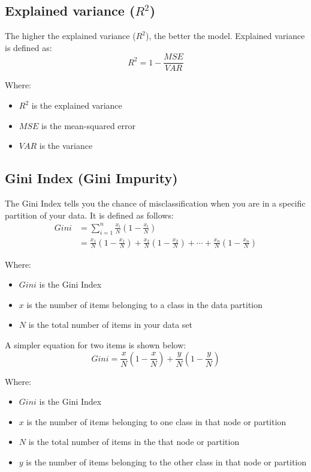 \documentclass[11pt]{article}
\begin{document}
\subsection{Explained variance (\(R^2\))}
\label{sec:org09e3cb3}
The higher the explained variance (\(R^2\)), the better the model. Explained variance is defined as:
\[R^2 = 1 - \frac{MSE}{VAR}\]

Where:
\begin{itemize}
\item \(R^2\) is the explained variance
\item \(MSE\) is the mean-squared error
\item \(VAR\) is the variance
\end{itemize}
\subsection{Gini Index (Gini Impurity)}
\label{sec:orgf96fc94}
The Gini Index tells you the chance of misclassification when you are in a specific partition of your data. It is defined as follows:
\begin{align*}
Gini &= \sum_{i = 1}^n \frac{x_i}{N} \left(1 - \frac{x_i}{N} \right) \\
&= \frac{x_1}{N} \left(1 - \frac{x_1}{N} \right) + \frac{x_2}{N} \left(1 - \frac{x_2}{N} \right) + \cdots + \frac{x_n}{N} \left(1 - \frac{x_n}{N} \right)
\end{align*}

Where:
\begin{itemize}
\item \(Gini\) is the Gini Index
\item \(x\) is the number of items belonging to a class in the data partition
\item \(N\) is the total number of items in your data set
\end{itemize}

A simpler equation for two items is shown below:
\[Gini = \frac{x}{N} \left(1 - \frac{x}{N} \right) + \frac{y}{N} \left(1 - \frac{y}{N} \right)\]

Where:
\begin{itemize}
\item \(Gini\) is the Gini Index
\item \(x\) is the number of items belonging to one class in that node or partition
\item \(N\) is the total number of items in the that node or partition
\item \(y\) is the number of items belonging to the other class in that node or partition
\end{itemize}
\end{document}
